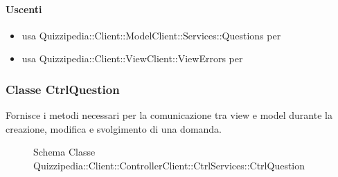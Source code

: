 \paragraph{Uscenti}
\begin{itemize}
\item usa Quizzipedia::Client::ModelClient::Services::Questions per 
\item usa Quizzipedia::Client::ViewClient::ViewErrors per 
\end{itemize}
\subsubsection{Classe CtrlQuestion}
Fornisce i metodi necessari per la comunicazione tra view e model durante la creazione, modifica e svolgimento di una domanda.
\begin{figure}[H]
\centering
\noindent{}
\caption[Schema Classe CtrlQuestion]{Schema Classe Quizzipedia::Client::ControllerClient::CtrlServices::CtrlQuestion}
\end{figure}
